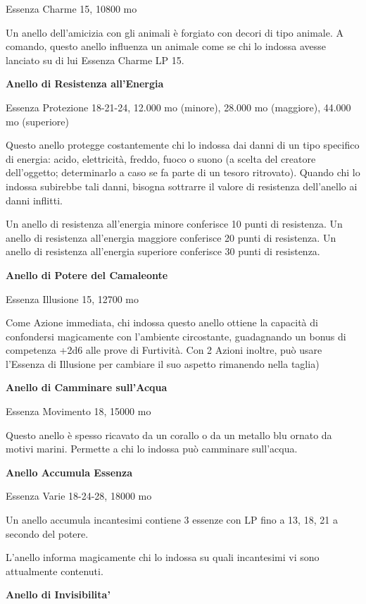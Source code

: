 \documentclass[a4paper,11pt,twoside,openany]{book}
\begin{document}
{Essenza Charme 15, 10800 mo

Un anello dell'amicizia con gli animali è forgiato con decori di tipo animale. A comando, questo anello influenza un animale come se chi lo indossa avesse lanciato su di lui Essenza Charme LP 15.

\textbf{Anello di Resistenza all'Energia}

Essenza Protezione 18-21-24, 12.000 mo (minore), 28.000 mo (maggiore),
44.000 mo (superiore)

Questo anello protegge costantemente chi lo indossa dai danni di un tipo specifico di energia: acido, elettricità, freddo, fuoco o suono (a scelta del creatore dell'oggetto; determinarlo a caso se fa parte di un tesoro ritrovato). Quando chi lo indossa subirebbe tali danni, bisogna sottrarre il valore di resistenza dell'anello ai danni inflitti.

Un anello di resistenza all'energia minore conferisce 10 punti di resistenza. Un anello di resistenza all'energia maggiore conferisce 20 punti di resistenza. Un anello di resistenza all'energia superiore conferisce 30 punti di resistenza.

\textbf{Anello di Potere del Camaleonte}

Essenza Illusione 15, 12700 mo

Come Azione immediata, chi indossa questo anello ottiene la capacità di confondersi magicamente con l'ambiente circostante, guadagnando un bonus di competenza +2d6 alle prove di Furtività. Con 2 Azioni inoltre, può usare l'Essenza di Illusione per cambiare il suo aspetto rimanendo nella taglia)

\textbf{Anello di Camminare sull'Acqua}

Essenza Movimento 18, 15000 mo

Questo anello è spesso ricavato da un corallo o da un metallo blu ornato da motivi marini. Permette a chi lo indossa può camminare sull'acqua.

\textbf{Anello Accumula Essenza}

Essenza Varie 18-24-28, 18000 mo

Un anello accumula incantesimi contiene 3 essenze con LP fino a 13, 18, 21 a secondo del potere.

L'anello informa magicamente chi lo indossa su quali incantesimi vi sono attualmente contenuti.

\textbf{Anello di Invisibilita'}

}
\end{document}
